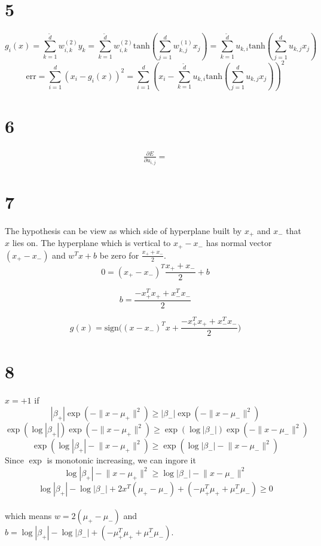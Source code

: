 \documentclass[12pt]{article}
\begin{document}
\section*{5}


\[
    g_i(x) = \sum_{k=1}^{\tilde{d}} w^{(2)}_{i,k} y_k
    = \sum_{k=1}^{\tilde{d}} w^{(2)}_{i,k} \text{tanh}(\sum_{j=1}^{d} w^{(1)}_{k, j}x_{j})
    = \sum_{k=1}^{\tilde{d}} u_{k,i} \text{tanh}(\sum_{j=1}^{d} u_{k, j}x_{j})
\]
\[
    \text{err} = \sum_{i=1}^{d} (x_i - g_i(x))^2 = 
    \sum_{i=1}^{d} (x_i - \sum_{k=1}^{\tilde{d}} u_{k,i} \text{tanh}(\sum_{j=1}^{d} u_{k, j}x_{j}))^2
\]

\section*{6}
\begin{align*}
    \frac{\partial E}{\partial u_{i, j}} =  
\end{align*}

\section*{7}
The hypothesis can be view as which side of 
hyperplane built by $x_+$ and $x_-$ that $x$ lies on. 
The hyperplane which is vertical to $x_+ - x_-$ has normal vector $(x_+ - x_-)$
and $w^Tx+b$ be zero for $\frac{x_++x_-}{2}$.
\[
    0 = (x_+ - x_-)^T \frac{x_++x_-}{2} + b
\]

\[
    b = \frac{-x_+^Tx_+ + x_-^Tx_-}{2}    
\]

\[
    g(x) = \text{sign} \Big(
        (x - x_-)^T x + \frac{-x_+^Tx_+ + x_-^Tx_-}{2} 
    \Big)    
\]

\section*{8}
$x = +1$ if 
\[
    |\beta_+| \exp ( -\lVert x - \mu_+ \rVert^2) \geq |\beta_-| \exp ( -\lVert x - \mu_- \rVert^2)
\]
\[
    \exp(\log|\beta_+|) \exp ( -\lVert x - \mu_+ \rVert^2) \geq \exp(\log|\beta_-|) \exp ( -\lVert x - \mu_- \rVert^2) 
\]
\[
    \exp (\log|\beta_+| -\lVert x - \mu_+ \rVert^2) \geq \exp(\log|\beta_-| -\lVert x - \mu_- \rVert^2) 
\]
Since $\exp$ is monotonic increasing, we can ingore it
\[
    \log|\beta_+| -\lVert x - \mu_+ \rVert^2 \geq \log|\beta_-| -\lVert x - \mu_- \rVert^2
\]
\[
    \log|\beta_+| - \log|\beta_-| + 2x^T(\mu_+ - \mu_-) + (-\mu_+^T\mu_+ + \mu_-^T\mu_-) \geq 0
\]
\\
which means
$w = 2(\mu_+ - \mu_-)$ and $b=\log|\beta_+| - \log|\beta_-| + (-\mu_+^T\mu_+ + \mu_-^T\mu_-)$.
\end{document}
